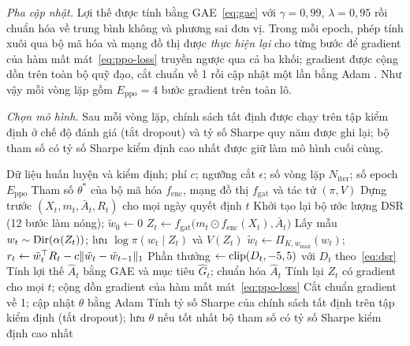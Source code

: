 \textit{Pha cập nhật.} Lợi thế được tính bằng GAE~\eqref{eq:gae} với $\gamma=0{,}99$, $\lambda=0{,}95$ rồi chuẩn hóa về trung bình không và phương sai đơn vị. Trong mỗi epoch, phép tính xuôi qua bộ mã hóa và mạng đồ thị được \emph{thực hiện lại} cho từng bước để gradient của hàm mất mát~\eqref{eq:ppo-loss} truyền ngược qua cả ba khối; gradient được cộng dồn trên toàn bộ quỹ đạo, cắt chuẩn về 1 rồi cập nhật một lần bằng Adam \cite{kingma2015}. Như vậy mỗi vòng lặp gồm $E_{\mathrm{ppo}}=4$ bước gradient trên toàn lô.

\textit{Chọn mô hình.} Sau mỗi vòng lặp, chính sách tất định được chạy trên tập kiểm định ở chế độ đánh giá (tắt dropout) và tỷ số Sharpe quy năm được ghi lại; bộ tham số có tỷ số Sharpe kiểm định cao nhất được giữ làm mô hình cuối cùng.

\begin{algorithm}[ht]
\caption{Huấn luyện đầu--cuối mô hình Transformer--GAT--PPO}
\label{alg:train}
\small
\begin{algorithmic}[1]
\Require Dữ liệu huấn luyện và kiểm định; phí $c$; ngưỡng cắt $\epsilon$; số vòng lặp $N_{\mathrm{iter}}$; số epoch $E_{\mathrm{ppo}}$
\Ensure Tham số $\theta^{*}$ của bộ mã hóa $f_{\mathrm{enc}}$, mạng đồ thị $f_{\mathrm{gat}}$ và tác tử $(\pi,V)$
\State Dựng trước $(X_t,m_t,\bar A_t,R_t)$ cho mọi ngày quyết định $t$
  \State Khởi tạo lại bộ ước lượng DSR (12 bước làm nóng); $\tilde w_{0}\gets 0$
   
    \State $Z_t\gets f_{\mathrm{gat}}\big(m_t\odot f_{\mathrm{enc}}(X_t),\bar A_t\big)$
    \State Lấy mẫu $w_t\sim\operatorname{Dir}(\alpha(Z_t))$; lưu $\log\pi(w_t\mid Z_t)$ và $V(Z_t)$
    \State $\tilde w_t\gets\Pi_{K,w_{\max}}(w_t)$;\quad $r_t\gets\tilde w_t^{\top} R_t-c\lVert\tilde w_t-\tilde w_{t-1}\rVert_1$
    \State Phần thưởng $\gets\operatorname{clip}(D_t,-5,5)$ với $D_t$ theo~\eqref{eq:dsr}
  \EndFor
  \State Tính lợi thế $\hat A_t$ bằng GAE và mục tiêu $\hat G_t$; chuẩn hóa $\hat A_t$
   
    \State Tính lại $Z_t$ có gradient cho mọi $t$; cộng dồn gradient của hàm mất mát~\eqref{eq:ppo-loss}
    \State Cắt chuẩn gradient về 1; cập nhật $\theta$ bằng Adam
  \EndFor
  \State Tính tỷ số Sharpe của chính sách tất định trên tập kiểm định (tắt dropout); lưu $\theta$ nếu tốt nhất
\EndFor
\State \Return bộ tham số có tỷ số Sharpe kiểm định cao nhất
\end{algorithmic}
\end{algorithm}

